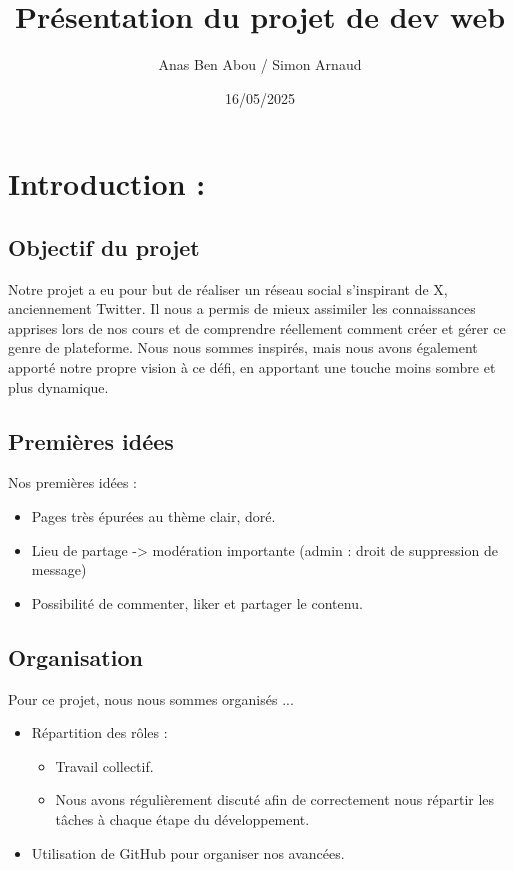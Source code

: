 \documentclass[12pt,a4paper]{article}
\title{Présentation du projet de dev web} %
\author{Anas Ben Abou / Simon Arnaud} %
\date{16/05/2025} %
\begin{document}
\maketitle

\tableofcontents

\newpage

\section{Introduction :}
\subsection{Objectif du projet}
Notre projet a eu pour but de réaliser un réseau social s'inspirant de X, anciennement Twitter.
Il nous a permis de mieux assimiler les connaissances apprises lors de nos cours et de comprendre réellement comment créer et gérer ce genre de plateforme. 
Nous nous sommes inspirés, mais nous avons également apporté notre propre vision à ce défi, en apportant une touche moins sombre et plus dynamique.\\
  
  
\subsection{Premières idées}
  Nos premières idées :
  \begin{itemize}
  \item Pages très épurées au thème clair, doré.
  \item Lieu de partage -> modération importante (admin : droit de suppression de message)
  \item Possibilité de commenter, liker et partager le contenu.
  \end{itemize}
  

\subsection{Organisation}
  Pour ce projet, nous nous sommes organisés ...
  \begin{itemize}
  \item Répartition des rôles :
      \begin{itemize}
      \item Travail collectif. 
      \item Nous avons régulièrement discuté afin de correctement nous répartir les tâches à chaque étape du développement.
      \end{itemize}
  \item Utilisation de GitHub pour organiser nos avancées.
  \end{itemize}
\end{document}
